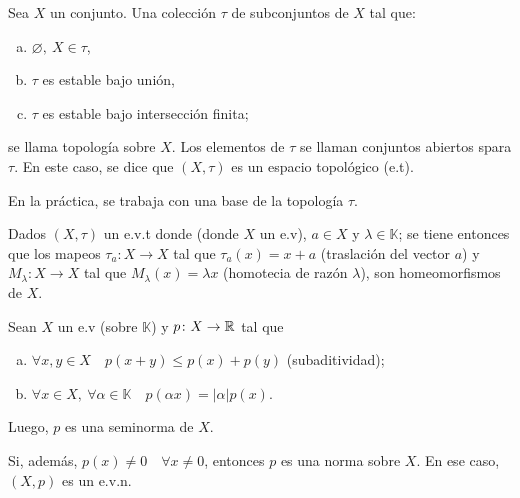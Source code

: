 
\begin{definition}[Topología]
	Sea $X$ un conjunto. Una colección $\tau$ de subconjuntos de $X$ tal que:
	\begin{enumerate}[a)]
		\item $\varnothing,\ X \in \tau$,

		\item $\tau$ es estable bajo unión,

		\item $\tau$ es estable bajo intersección finita;
	\end{enumerate}
	se llama topología sobre $X$. Los elementos de $\tau$ se llaman conjuntos abiertos spara $\tau$. En este caso, se dice que $(X, \tau)$ es un espacio topológico (e.t).
\end{definition}

\begin{note}
	En la práctica, se trabaja con una base de la topología $\tau$.
\end{note}

\begin{observe}
	Dados $(X, \tau)$ un e.v.t donde (donde $X$ un e.v), $a \in X$ y $\lambda \in \mathbb{K}$; se tiene entonces que los mapeos $\tau_{a} \colon X \to X$ tal que $\tau_{a}(x) = x + a$ (traslación del vector $a$) y $M_{\lambda} \colon X \to X$ tal que $M_{\lambda}(x) = \lambda x$ (homotecia de razón $\lambda$), son homeomorfismos de $X$.
\end{observe}

\begin{definition}[seminorma]
	Sean $X$ un e.v (sobre $\mathbb{K}$) y $p \colon X \to \mathbb{R}$ tal que
	\begin{enumerate}[a)]
		\item $\forall x,y \in X \quad p(x + y) \leq p(x) + p(y)$ (subaditividad);
	
		\item $\forall x \in X,\ \forall \alpha \in \mathbb{K} \quad p(\alpha x) = | \alpha | p(x)$.
	\end{enumerate}
	Luego, $p$ es una seminorma de $X$. \par
	Si, además, $p(x) \neq 0 \quad \forall x \neq 0$, entonces $p$ es una norma sobre $X$. En ese caso, $(X, p)$ es un e.v.n.
\end{definition}

